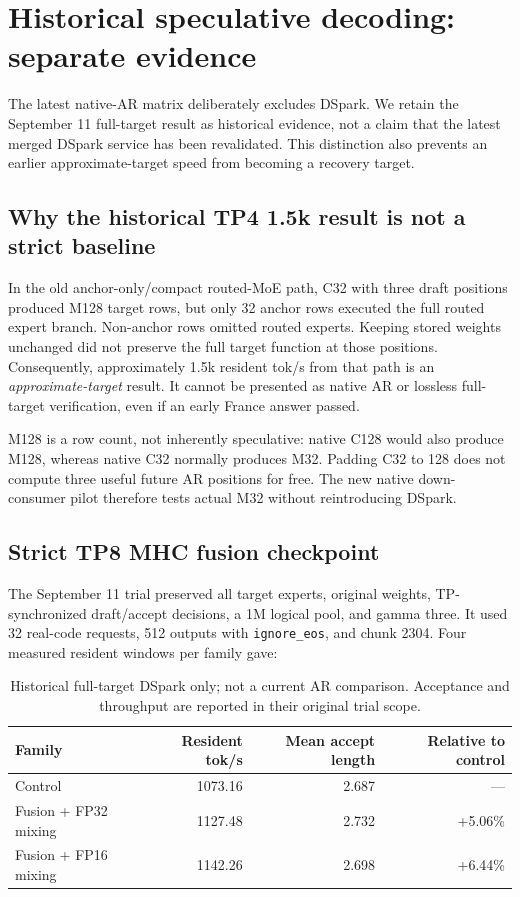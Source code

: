 \section{Historical speculative decoding: separate evidence}
\label{sec:spec-history}

The latest native-AR matrix deliberately excludes DSpark. We retain the
September 11 full-target result as historical evidence, not a claim that the
latest merged DSpark service has been revalidated. This distinction also
prevents an earlier approximate-target speed from becoming a recovery target.

\subsection{Why the historical TP4 1.5k result is not a strict baseline}

In the old anchor-only/compact routed-MoE path, C32 with three draft positions
produced M128 target rows, but only 32 anchor rows executed the full routed
expert branch. Non-anchor rows omitted routed experts. Keeping stored weights
unchanged did not preserve the full target function at those positions.
Consequently, approximately 1.5k resident tok/s from that path is an
\emph{approximate-target} result. It cannot be presented as native AR or
lossless full-target verification, even if an early France answer passed.

M128 is a row count, not inherently speculative: native C128 would also
produce M128, whereas native C32 normally produces M32. Padding C32 to 128
does not compute three useful future AR positions for free. The new native
down-consumer pilot therefore tests actual M32 without reintroducing DSpark.

\subsection{Strict TP8 MHC fusion checkpoint}

The September 11 trial preserved all target experts, original weights,
TP-synchronized draft/accept decisions, a 1M logical pool, and gamma three.
It used 32 real-code requests, 512 outputs with \texttt{ignore\_eos}, and
chunk 2304. Four measured resident windows per family gave:

\begin{table}[tp]
  \centering
  \caption{Historical full-target DSpark only; not a current AR comparison.
  Acceptance and throughput are reported in their original trial scope.}
  \label{tab:dspark-history}
  \begin{tabular}{@{}lrrr@{}}
    \toprule
    Family & Resident tok/s & Mean accept length & Relative to control \\
    \midrule
    Control & 1073.16 & 2.687 & --- \\
    Fusion + FP32 mixing & 1127.48 & 2.732 & +5.06\% \\
    Fusion + FP16 mixing & 1142.26 & 2.698 & +6.44\% \\
    \bottomrule
  \end{tabular}
\end{table}

